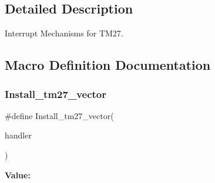 \subsection{Detailed Description}
Interrupt Mechanisms for T\+M27. 



\subsection{Macro Definition Documentation}
\mbox{\label{group__tll6527m__tm27_gafb2d35f87c2bc11dcc6c700e9abbc183}} 
\subsubsection{\texorpdfstring{Install\_tm27\_vector}{Install\_tm27\_vector}}
{\footnotesize\ttfamily \#define Install\+\_\+tm27\+\_\+vector(\begin{DoxyParamCaption}\item[{}]{handler }\end{DoxyParamCaption})}

{\bfseries Value\+:}
\begin{DoxyCode}{0}
\DoxyCodeLine{\{ \(\backslash\)}
\DoxyCodeLine{\}}

\end{DoxyCode}
